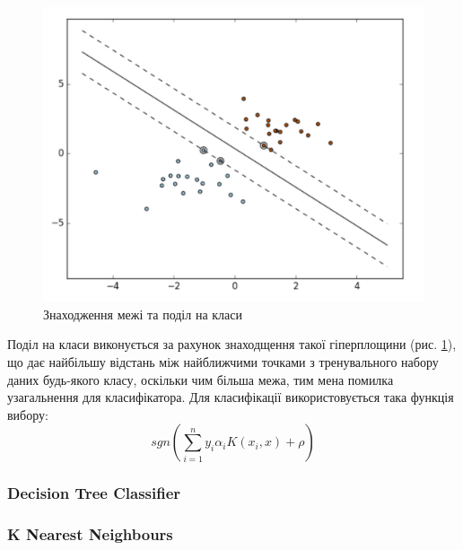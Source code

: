 \begin{figure}[h!]
  \includegraphics[width=\linewidth]{figures/svm.png}
  \caption{Знаходження межі та поділ на класи}
  \label{fig:svm}
\end{figure}

Поділ на класи виконується за рахунок знаходщення такої гіперплощини (рис. \ref{fig:svm}), що дає найбільшу відстань між найближчими точками з тренувального набору даних будь-якого класу, оскільки чим більша межа, тим мена помилка узагальнення для класифікатора. Для класифікації використовується така функція вибору:
\begin{equation}
    \label{eq:svc}
    sgn(\sum_{i=1}^n y_{i}\alpha_{i}K(x_{i}, x)+\rho)
\end{equation}

\subsubsection{Decision Tree Classifier}

\subsubsection{K Nearest Neighbours}



